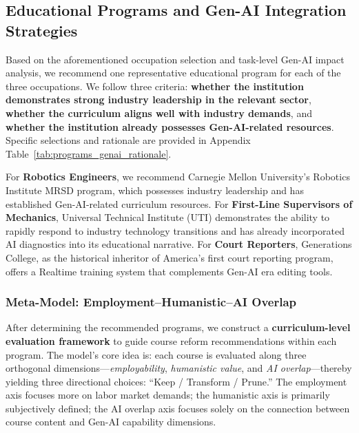 \subsection{Educational Programs and Gen-AI Integration Strategies}

\label{subsec:task3_programs}

Based on the aforementioned occupation selection and task-level Gen-AI impact analysis, we recommend one representative educational program for each of the three occupations. We follow three criteria: \textbf{whether the institution demonstrates strong industry leadership in the relevant sector}, \textbf{whether the curriculum aligns well with industry demands}, and \textbf{whether the institution already possesses Gen-AI-related resources}. Specific selections and rationale are provided in Appendix Table~\ref{tab:programs_genai_rationale}.

For \textbf{Robotics Engineers}, we recommend Carnegie Mellon University's Robotics Institute MRSD program, which possesses industry leadership and has established Gen-AI-related curriculum resources.
For \textbf{First-Line Supervisors of Mechanics}, Universal Technical Institute (UTI) demonstrates the ability to rapidly respond to industry technology transitions and has already incorporated AI diagnostics into its educational narrative.
For \textbf{Court Reporters}, Generations College, as the historical inheritor of America's first court reporting program, offers a Realtime training system that complements Gen-AI era editing tools.

\subsubsection{Meta-Model: Employment--Humanistic--AI Overlap}
\label{subsubsec:three_axis_metamodel}

After determining the recommended programs, we construct a \textbf{curriculum-level evaluation framework} to guide course reform recommendations within each program. The model's core idea is: each course is evaluated along three orthogonal dimensions---\emph{employability}, \emph{humanistic value}, and \emph{AI overlap}---thereby yielding three directional choices: ``Keep / Transform / Prune.'' The employment axis focuses more on labor market demands; the humanistic axis is primarily subjectively defined; the AI overlap axis focuses solely on the connection between course content and Gen-AI capability dimensions.

